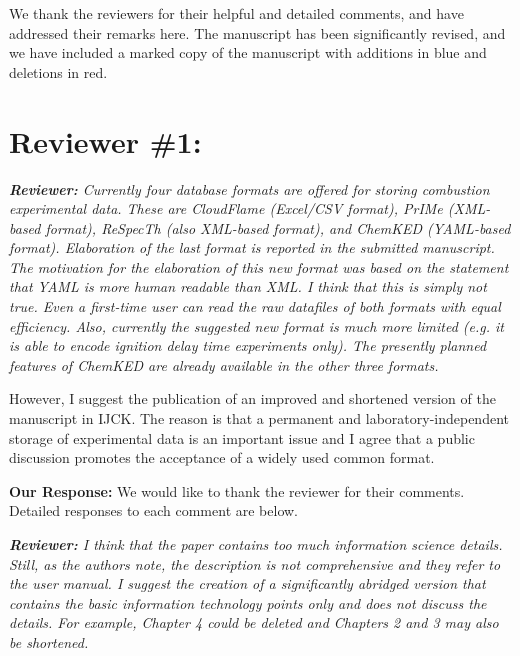 \documentclass[a4paper,10pt]{elsarticle}
\newenvironment{reviewer}{\vspace{0.5\baselineskip}\begingroup\itshape\textbf{Reviewer:}}{\endgroup}
\newenvironment{response}{\textbf{Our Response:}}{\vspace{0.5\baselineskip}}
\begin{document}
We thank the reviewers for their helpful and detailed comments, and have addressed their remarks
here. The manuscript has been significantly revised, and we have included a marked copy of the
manuscript with additions in blue and deletions in red.


\section*{Reviewer \#1:}

\begin{reviewer}
    Currently four database formats are offered for storing combustion experimental data. These are
    CloudFlame (Excel/CSV format), PrIMe (XML-based format), ReSpecTh (also XML-based format), and
    ChemKED (YAML-based format). Elaboration of the last format is reported in the submitted
    manuscript. The motivation for the elaboration of this new format was based on the statement
    that YAML is more human readable than XML. I think that this is simply not true. Even a
    first-time user can read the raw datafiles of both formats with equal efficiency. Also,
    currently the suggested new format is much more limited (e.g. it is able to encode ignition
    delay time experiments only). The presently planned features of ChemKED are already available in
    the other three formats.

    However, I suggest the publication of an improved and shortened version of the manuscript in
    IJCK. The reason is that a permanent and laboratory-independent storage of experimental data is
    an important issue and I agree that a public discussion promotes the acceptance of a widely used
    common format.
\end{reviewer}

\begin{response}
    We would like to thank the reviewer for their comments. Detailed responses to each comment are
    below.
\end{response}

\begin{reviewer}
    I think that the paper contains too much information science details. Still, as the authors
    note, the description is not comprehensive and they refer to the user manual. I suggest the
    creation of a significantly abridged version that contains the basic information technology
    points only and does not discuss the details. For example, Chapter 4 could be deleted and
    Chapters 2 and 3 may also be shortened.
\end{reviewer}
\end{document}
